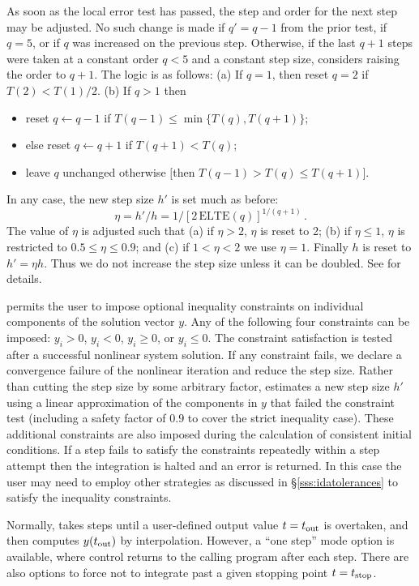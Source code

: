 As soon as the local error test has passed, the step and order for the
next step may be adjusted.  No such change is made if $q' = q-1$ from
the prior test, if $q = 5$, or if $q$ was increased on the previous
step.  Otherwise, if the last $q+1$ steps were taken at a constant
order $q < 5$ and a constant step size, {\ida} considers raising the order
to $q+1$.  The logic is as follows: (a) If $q = 1$, then reset $q = 2$
if $T(2) < T(1)/2$.  (b) If $q > 1$ then
\begin{itemize}
\item reset $q \leftarrow q-1$ if $T(q-1) \leq \min\{T(q),T(q+1)\}$;
\item else reset $q \leftarrow q+1$ if $T(q+1) < T(q)$;
\item leave $q$ unchanged otherwise $[$then $T(q-1) > T(q) \leq T(q+1)]$.
\end{itemize}
In any case, the new step size $h'$ is set much as before:
\[ \eta = h'/h = 1/[2 \, \mbox{ELTE}(q)]^{1/(q+1)} \, . \]
The value of $\eta$ is adjusted such that (a) if $\eta > 2$, $\eta$ is
reset to 2; (b) if $\eta \leq 1$, $\eta$ is restricted to
$0.5 \leq \eta \leq 0.9$; and (c) if $1 < \eta < 2$ we use $\eta = 1$.
Finally $h$ is reset to $h' = \eta h$.  Thus we do not increase the
step size unless it can be doubled.  See \cite{BCP:96} for details.

{\ida} permits the user to impose optional inequality constraints on individual
components of the solution vector $y$. Any of the following four constraints
can be imposed: $y_i > 0$, $y_i < 0$, $y_i \geq 0$, or $y_i \leq 0$.
The constraint satisfaction is tested after a successful nonlinear system solution.
If any constraint fails, we declare a convergence failure of the nonlinear iteration
and reduce the step size. Rather than cutting the step size by some arbitrary factor,
{\ida} estimates a new step size $h'$ using a linear approximation of the components
in $y$ that failed the constraint test (including a safety factor of $0.9$ to
cover the strict inequality case). These additional constraints are also imposed
during the calculation of consistent initial conditions.
If a step fails to satisfy the constraints repeatedly within a step attempt
then the integration is halted and an error is returned. In this case the user
may need to employ other strategies as discussed in \S\ref{sss:idatolerances} to
satisfy the inequality constraints.

Normally, {\ida} takes steps until a user-defined output value $t =
t_{\mbox{\scriptsize out}}$ is overtaken, and then computes
$y(t_{\mbox{\scriptsize out}})$ by interpolation.  However, a
``one step'' mode option is available, where control returns to the
calling program after each step.  There are also options to force {\ida}
not to integrate past a given stopping point $t = t_{\mbox{\scriptsize
stop}}$.


